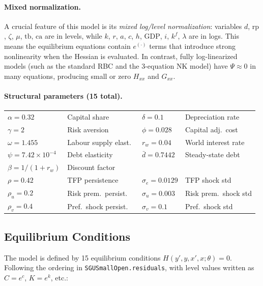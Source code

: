\documentclass[11pt,a4paper]{article}
\theoremstyle{definition}
\newcommand{\code}[1]{\texttt{\color{codecolor}#1}}
\begin{document}
	\paragraph{Mixed normalization.}
	A crucial feature of this model is its \emph{mixed log/level normalization}: variables $d$, $\text{rp}$, $\zeta$, $\mu$, $\text{tb}$, $\text{ca}$ are in levels, while $k$, $r$, $a$, $c$, $h$, $\text{GDP}$, $i$, $k^f$, $\lambda$ are in logs.
	This means the equilibrium equations contain $e^{(\cdot)}$ terms that introduce strong nonlinearity when the Hessian is evaluated.
	In contrast, fully log-linearized models (such as the standard RBC and the 3-equation NK model) have $\Psi \approx 0$ in many equations, producing small or zero $H_{xx}$ and $G_{xx}$.

	\paragraph{Structural parameters (15 total).}
	\begin{center}
	\begin{tabular}{llll}
		\toprule
		$\alpha = 0.32$ & Capital share & $\delta = 0.1$ & Depreciation rate \\
		$\gamma = 2$ & Risk aversion & $\phi = 0.028$ & Capital adj.\ cost \\
		$\omega = 1.455$ & Labour supply elast.\ & $r_w = 0.04$ & World interest rate \\
		$\psi = 7.42 \times 10^{-4}$ & Debt elasticity & $\bar{d} = 0.7442$ & Steady-state debt \\
		$\beta = 1/(1+r_w)$ & Discount factor & & \\
		\midrule
		$\rho = 0.42$ & TFP persistence & $\sigma_e = 0.0129$ & TFP shock std \\
		$\rho_u = 0.2$ & Risk prem.\ persist.\ & $\sigma_u = 0.003$ & Risk prem.\ shock std \\
		$\rho_v = 0.4$ & Pref.\ shock persist.\ & $\sigma_v = 0.1$ & Pref.\ shock std \\
		\bottomrule
	\end{tabular}
	\end{center}

	\subsection{Equilibrium Conditions}
	\label{sec:sgu_equations}

	The model is defined by 15 equilibrium conditions $H(y', y, x', x; \theta) = 0$.
	Following the ordering in \code{SGUSmallOpen.residuals}, with level values written as $C = e^c$, $K = e^k$, etc.:
\end{document}
